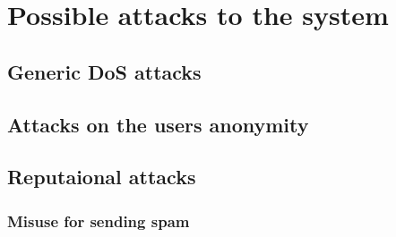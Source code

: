 \section{Possible attacks to the system}
\subsection{Generic DoS attacks}
\subsection{Attacks on the users anonymity}
\subsection{Reputaional attacks}
\subsubsection{Misuse for sending spam}


